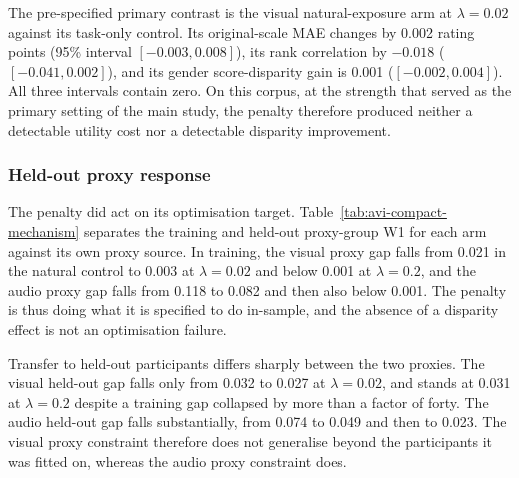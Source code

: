 The pre-specified primary contrast is the visual natural-exposure arm at $\lambda=0.02$
against its task-only control. Its original-scale MAE changes by 0.002 rating points
(95\% interval $[-0.003, 0.008]$), its rank correlation by $-0.018$
($[-0.041, 0.002]$), and its gender score-disparity gain is 0.001
($[-0.002, 0.004]$). All three intervals contain zero. On this corpus, at the strength
that served as the primary setting of the main study, the penalty therefore produced
neither a detectable utility cost nor a detectable disparity improvement.

\subsubsection{Held-out proxy response}

The penalty did act on its optimisation target. Table~\ref{tab:avi-compact-mechanism}
separates the training and held-out proxy-group W1 for each arm against its own proxy
source. In training, the visual proxy gap falls from 0.021 in the natural control to 0.003
at $\lambda=0.02$ and below 0.001 at $\lambda=0.2$, and the audio proxy gap falls from 0.118
to 0.082 and then also below 0.001. The penalty is thus doing what it is specified to do
in-sample, and the absence of a disparity effect is not an optimisation failure.

Transfer to held-out participants differs sharply between the two proxies. The visual
held-out gap falls only from 0.032 to 0.027 at $\lambda=0.02$, and stands at 0.031 at
$\lambda=0.2$ despite a training gap collapsed by more than a factor of forty. The audio
held-out gap falls substantially, from 0.074 to 0.049 and then to 0.023. The visual proxy
constraint therefore does not generalise beyond the participants it was fitted on, whereas
the audio proxy constraint does.


